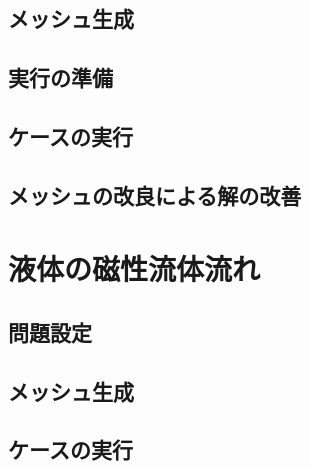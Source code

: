 \subsection{メッシュ生成}
\label{ssec:3.4.2}

\subsection{実行の準備}
\label{ssec:3.4.3}

\subsection{ケースの実行}
\label{ssec:3.4.4}

\subsection{メッシュの改良による解の改善}
\label{ssec:3.4.5}


\section{液体の磁性流体流れ}
\label{sec:3.5}

\subsection{問題設定}
\label{ssec:3.5.1}

\subsection{メッシュ生成}
\label{ssec:3.5.2}

\subsection{ケースの実行}
\label{ssec:3.5.3}
